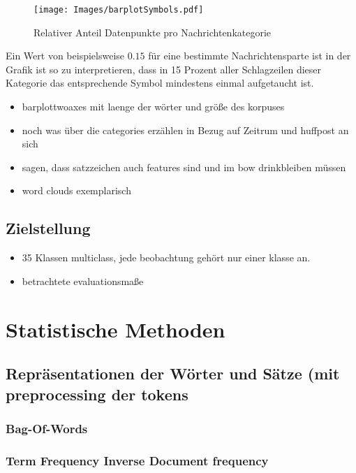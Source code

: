 \documentclass[a4paper,11pt]{article}
\begin{document}
\begin{figure}[ht]
    \centering
\texttt{[image: Images/barplotSymbols.pdf]} 
\label{abb:barplotSymbols}
\caption{Relativer Anteil Datenpunkte pro Nachrichtenkategorie}
\end{figure}

Ein Wert von beispielsweise $0.15$ für eine bestimmte Nachrichtensparte ist in der Grafik ist so zu interpretieren, dass in 15 Prozent aller Schlagzeilen dieser Kategorie das entsprechende Symbol mindestens einmal aufgetaucht ist.


\begin{itemize}
\item barplottwoaxes mit laenge der wörter und größe des korpuses
    \item noch was über die categories erzählen in Bezug auf Zeitrum und huffpost an sich
    \item sagen, dass satzzeichen auch features sind und im bow drinkbleiben müssen
    \item word clouds exemplarisch
\end{itemize}{}

\subsection{Zielstellung} \label{Kap:Zielst}

\begin{itemize}
    \item 35 Klassen multiclass, jede beobachtung gehört nur einer klasse an.
    \item betrachtete evaluationsmaße
\end{itemize}{}


\section{Statistische Methoden}

\subsection{Repräsentationen der Wörter und Sätze (mit preprocessing der tokens}
\subsubsection{Bag-Of-Words}
\subsubsection{Term Frequency Inverse Document frequency}
\end{document}
